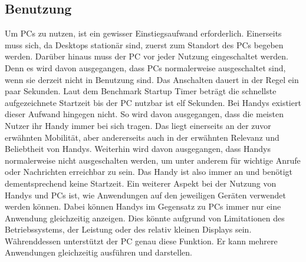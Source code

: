 \subsection{Benutzung}
	Um PCs zu nutzen, ist ein gewisser Einstiegsaufwand erforderlich. %
		Einerseits muss sich, da Desktops stationär sind, zuerst zum Standort des PCs begeben werden. %
		Darüber hinaus muss der PC vor jeder Nutzung eingeschaltet werden. Denn es wird davon ausgegangen, dass PCs normalerweise ausgeschaltet sind, wenn sie derzeit nicht in Benutzung sind. Das Anschalten dauert in der Regel ein paar Sekunden. Laut dem Benchmark \glqq Startup Timer\grqq{} beträgt die schnellste aufgezeichnete Startzeit bis der PC nutzbar ist elf Sekunden\cite{pcVsphone_boottime}.\newline%
	Bei Handys existiert dieser Aufwand hingegen nicht. %
		So wird davon ausgegangen, dass die meisten Nutzer ihr Handy immer bei sich tragen. Das liegt einerseits an der zuvor erwähnten Mobilität, aber andererseits auch in der  erwähnten Relevanz und Beliebtheit von Handys. %
		Weiterhin wird davon ausgegangen, dass Handys normalerweise nicht ausgeschalten werden, um unter anderem für wichtige Anrufe oder Nachrichten erreichbar zu sein. Das Handy ist also immer an und benötigt dementsprechend keine Startzeit.\newline%
Ein weiterer Aspekt bei der Nutzung von Handys und PCs ist, wie Anwendungen auf den jeweiligen Geräten verwendet werden können. %
	Dabei können Handys im Gegensatz zu PCs immer nur eine Anwendung gleichzeitig anzeigen. Dies könnte aufgrund von Limitationen des Betriebssystems, der Leistung oder des relativ kleinen Displays sein.\newline%
	Währenddessen unterstützt der PC genau diese Funktion. Er kann mehrere Anwendungen gleichzeitig ausführen und darstellen.%
	
	
%
%
